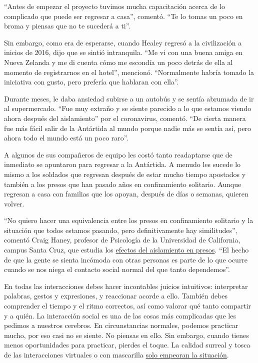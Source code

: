 ``Antes de empezar el proyecto tuvimos mucha capacitación acerca de lo
complicado que puede ser regresar a casa'', comentó. ``Te lo tomas un
poco en broma y piensas que no te sucederá a ti''.

Sin embargo, como era de esperarse, cuando Healey regresó a la
civilización a inicios de 2016, dijo que se sintió intranquila. ``Me vi
con una buena amiga en Nueva Zelanda y me di cuenta cómo me escondía un
poco detrás de ella al momento de registrarnos en el hotel'', mencionó.
``Normalmente habría tomado la iniciativa con gusto, pero prefería que
hablaran con ella''.

Durante meses, le daba ansiedad subirse a un autobús y se sentía
abrumada de ir al supermercado. ``Fue muy extraño y se siente parecido a
lo que estamos viendo ahora después del aislamiento'' por el
coronavirus, comentó. ``De cierta manera fue más fácil salir de la
Antártida al mundo porque nadie más se sentía así, pero ahora todo el
mundo está un poco raro''.

A algunos de sus compañeros de equipo les costó tanto readaptarse que de
inmediato se apuntaron para regresar a la Antártida. A menudo les sucede
lo mismo a los soldados que regresan después de estar mucho tiempo
apostados y también a los presos que han pasado años en confinamiento
solitario. Aunque regresan a casa con familias que los apoyan, después
de días o semanas, quieren volver.

``No quiero hacer una equivalencia entre los presos en confinamiento
solitario y la situación que todos estamos pasando, pero definitivamente
hay similitudes'', comentó Craig Haney, profesor de Psicología de la
Universidad de California, campus Santa Cruz, que estudia los
\href{https://scholarlycommons.law.northwestern.edu/nulr/vol115/iss1/5/}{efectos
del aislamiento en presos}. ``El hecho de que la gente se sienta
incómoda con otras personas es parte de lo que ocurre cuando se nos
niega el contacto social normal del que tanto dependemos''.

En todas las interacciones debes hacer incontables juicios intuitivos:
interpretar palabras, gestos y expresiones, y reaccionar acorde a ello.
También debes comprender el tiempo y el ritmo correctos, así como
valorar qué tanto compartir y a quién. La interacción social es una de
las cosas más complicadas que les pedimos a nuestros cerebros. En
circunstancias normales, podemos practicar mucho, por eso casi no se
siente. No piensas en ello. Sin embargo, cuando tienes menos
oportunidades para practicar, pierdes el toque. La calidad surreal y
tosca de las interacciones virtuales o con mascarilla
\href{https://www.nytimes3xbfgragh.onion/2020/04/29/sunday-review/zoom-video-conference.html}{solo
empeoran la situación}.

